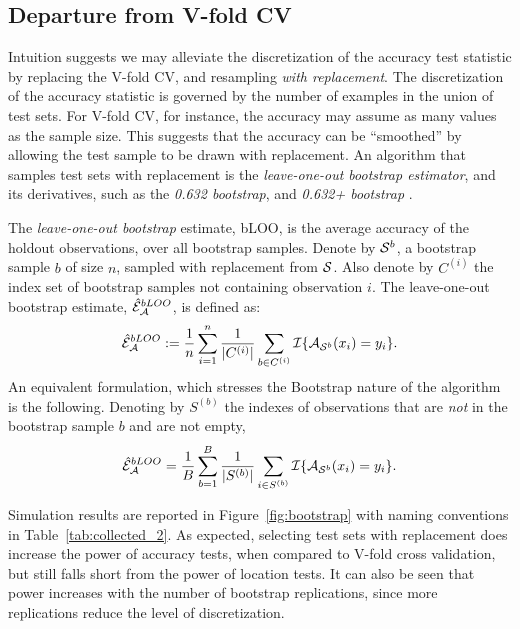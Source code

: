 \documentclass[12pt,a4paper]{article}
\begin{document}
\subsection{Departure from V-fold CV}
\label{sec:bootstrap}

Intuition suggests we may alleviate the discretization of the accuracy test statistic by replacing the V-fold CV, and resampling \emph{with replacement}.
The discretization of the accuracy statistic is governed by the number of examples in the union of test sets.
For V-fold CV, for instance, the accuracy may assume as many values as the sample size. 
This suggests that the accuracy can be ``smoothed'' by allowing the test sample to be drawn with replacement. 
An algorithm that samples test sets with replacement is the \emph{leave-one-out bootstrap estimator},  and its derivatives, such as the \emph{0.632 bootstrap}, and \emph{0.632+ bootstrap} \citep[Sec 7.11]{hastie_elements_2003}.
\begin{definition}[bLOO]
	\label{def:bloo}
	The \emph{leave-one-out bootstrap} estimate, bLOO, is the average accuracy of the holdout observations, over all bootstrap samples. 
	Denote by $\mathcal{S}^b$, a bootstrap sample $b$ of size $n$, sampled with replacement from $\mathcal{S}$. 
	Also denote by $C^{(i)}$ the index set of bootstrap samples not containing observation $i$.
	The leave-one-out bootstrap estimate, $\hat{\mathcal{E}}_{\mathcal{A}}^{bLOO}$,  is defined as:
	\begin{align}
	\hat{\mathcal{E}}_{\mathcal{A}}^{bLOO}:= \frac 1n \sum_{i=1}^{n} \frac{1}{|C^{(i)}|} \sum_{b \in C^{(i)}} \mathcal{I}{\{ \mathcal{A}_{\mathcal{S}^b}(x_i)=y_i \}}.
	\end{align}
	An equivalent formulation, which stresses the Bootstrap nature of the algorithm is the following. 
	Denoting by $S^{(b)}$ the indexes of observations that are \emph{not} in the bootstrap sample $b$ and are not empty, 
	\begin{align}
	\hat{\mathcal{E}}_{\mathcal{A}}^{bLOO} = \frac 1B \sum_{b=1}^{B} \frac{1}{|S^{(b)}|} \sum_{i \in S^{(b)}} \mathcal{I}{\{ \mathcal{A}_{\mathcal{S}^b}(x_i)=y_i \}}.
	\end{align}
\end{definition}


Simulation results are reported in Figure~\ref{fig:bootstrap} with naming conventions in Table~\ref{tab:collected_2}.
As expected, selecting test sets with replacement does increase the power of accuracy tests, when compared to V-fold cross validation, but still falls short from the power of location tests. 
It can also be seen that power increases with the number of bootstrap replications, since more replications reduce the level of discretization.
\end{document}
